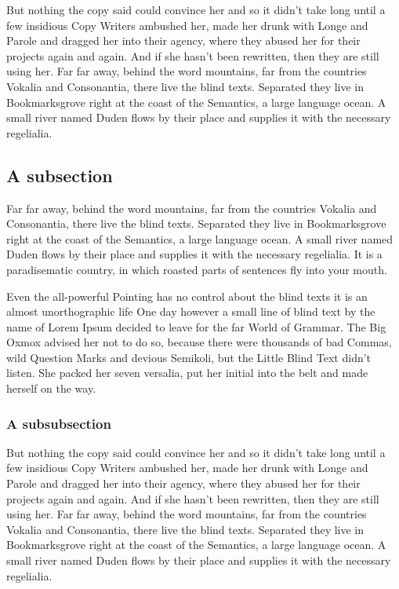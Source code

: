 \documentclass[11pt]{article}
\begin{document}
But nothing the copy said could convince her and so it didn’t take long until a few insidious Copy Writers ambushed her, made her drunk with Longe and Parole and dragged her into their agency, where they abused her for their projects again and again. And if she hasn’t been rewritten, then they are still using her. Far far away, behind the word mountains, far from the countries Vokalia and Consonantia, there live the blind texts. Separated they live in Bookmarksgrove right at the coast of the Semantics, a large language ocean. A small river named Duden flows by their place and supplies it with the necessary regelialia.

\subsection{A subsection}

Far far away, behind the word mountains, far from the countries Vokalia and Consonantia, there live the blind texts. Separated they live in Bookmarksgrove right at the coast of the Semantics, a large language ocean. A small river named Duden flows by their place and supplies it with the necessary regelialia. It is a paradisematic country, in which roasted parts of sentences fly into your mouth.

Even the all-powerful Pointing has no control about the blind texts it is an almost unorthographic life One day however a small line of blind text by the name of Lorem Ipsum decided to leave for the far World of Grammar. The Big Oxmox advised her not to do so, because there were thousands of bad Commas, wild Question Marks and devious Semikoli, but the Little Blind Text didn’t listen. She packed her seven versalia, put her initial into the belt and made herself on the way.

\subsubsection{A subsubsection}

But nothing the copy said could convince her and so it didn’t take long until a few insidious Copy Writers ambushed her, made her drunk with Longe and Parole and dragged her into their agency, where they abused her for their projects again and again. And if she hasn’t been rewritten, then they are still using her. Far far away, behind the word mountains, far from the countries Vokalia and Consonantia, there live the blind texts. Separated they live in Bookmarksgrove right at the coast of the Semantics, a large language ocean. A small river named Duden flows by their place and supplies it with the necessary regelialia.
\end{document}
